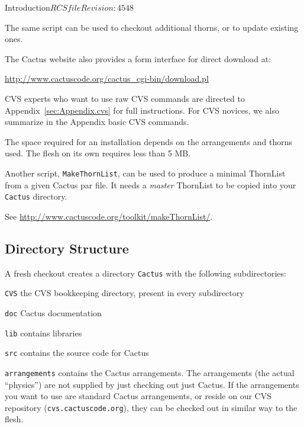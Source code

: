 \begin{cactuspart}{Introduction}{$RCSfile$}{$Revision: 4548 $}

The same script can be used to checkout additional thorns, or to update 
existing ones.

The Cactus website also provides a form interface for direct download at:

\url{http://www.cactuscode.org/cactus\_cgi-bin/download.pl}

CVS experts who want to use raw CVS commands are directed to
Appendix~\ref{sec:Appendix.cvs} for full instructions. For CVS novices,
we also summarize in the Appendix basic CVS commands.

The space required for an installation depends on the arrangements and
thorns used. The flesh on its own requires less than 5 MB.

Another script, \texttt{MakeThornList}, can be used to produce a minimal
ThornList from a given Cactus par file.  It needs a \emph{master} ThornList
to be copied into your \texttt{Cactus} directory.

See \url{http://www.cactuscode.org/toolkit/makeThornList/}.



\subsection{Directory Structure}
\label{sec:dist}

A fresh checkout creates a directory \texttt{Cactus} with the
following subdirectories:

\begin{Lentry}

\item[\texttt{CVS}] the CVS bookkeeping directory, present in every subdirectory

\item[\texttt{doc}] Cactus documentation

\item[\texttt{lib}] contains libraries

\item[\texttt{src}] contains the source code for Cactus

\item [\texttt{arrangements}] contains the Cactus arrangements. The arrangements
  (the actual ``physics'') are not supplied by just checking out just Cactus.
  If the arrangements you want to use are standard Cactus arrangements, or
  reside on our CVS repository (\texttt{cvs.cactuscode.org}),
  they can be checked out in similar way to the flesh.
\end{Lentry}


\end{cactuspart}
